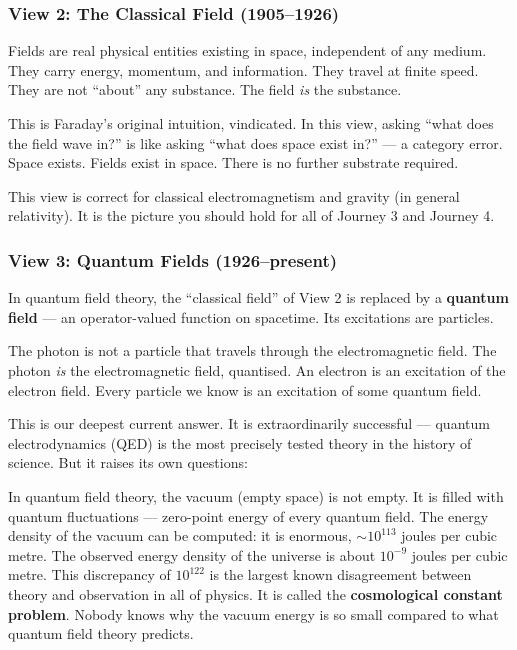\documentclass[12pt, a4paper, twoside]{book}
\newcounter{problem}[chapter]
\theoremstyle{disc}
\begin{document}
\subsubsection*{View 2: The Classical Field (1905--1926)}

Fields are real physical entities existing in space, independent of any medium. They carry energy, momentum, and information. They travel at finite speed. They are not ``about'' any substance. The field \emph{is} the substance.

This is Faraday's original intuition, vindicated. In this view, asking ``what does the field wave in?'' is like asking ``what does space exist in?'' --- a category error. Space exists. Fields exist in space. There is no further substrate required.

This view is correct for classical electromagnetism and gravity (in general relativity). It is the picture you should hold for all of Journey 3 and Journey 4.

\subsubsection*{View 3: Quantum Fields (1926--present)}

In quantum field theory, the ``classical field'' of View 2 is replaced by a \textbf{quantum field} --- an operator-valued function on spacetime. Its excitations are particles.

The photon is not a particle that travels through the electromagnetic field. The photon \emph{is} the electromagnetic field, quantised. An electron is an excitation of the electron field. Every particle we know is an excitation of some quantum field.

This is our deepest current answer. It is extraordinarily successful --- quantum electrodynamics (QED) is the most precisely tested theory in the history of science. But it raises its own questions:

\begin{openquestion}
In quantum field theory, the vacuum (empty space) is not empty. It is filled with quantum fluctuations --- zero-point energy of every quantum field. The energy density of the vacuum can be computed: it is enormous, $\sim 10^{113}$ joules per cubic metre. The observed energy density of the universe is about $10^{-9}$ joules per cubic metre. This discrepancy of $10^{122}$ is the largest known disagreement between theory and observation in all of physics. It is called the \textbf{cosmological constant problem}. Nobody knows why the vacuum energy is so small compared to what quantum field theory predicts.
\end{openquestion}
\end{document}
